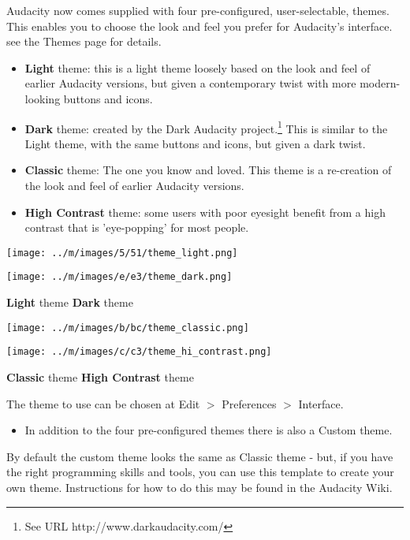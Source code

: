 \documentclass[twocolumn]{book}
\begin{document}
Audacity now comes supplied with four pre-configured, user-selectable, themes.  This enables you to choose the look and feel you prefer for Audacity's interface. see the Themes page for details.
\begin{itemize}
\item \textbf{Light} theme: this is a light theme loosely based on the look and feel of earlier Audacity versions, but given a contemporary twist with more modern-looking buttons and icons. 
\item \textbf{Dark} theme: created by the Dark Audacity project.\footnote{See URL http://www.darkaudacity.com/} This is similar to the Light theme, with the same buttons and icons, but given a dark twist.
\item \textbf{Classic} theme: The one you know and loved. This theme is a re-creation of the look and feel of earlier Audacity versions. 
\item \textbf{High Contrast} theme: some users with poor eyesight benefit from a high contrast that is 'eye-popping' for most people.
\end{itemize}



\* \* \* \* \par\texttt{[image: ../m/images/5/51/theme\_light.png]}\par
\* \* \* \* \par\texttt{[image: ../m/images/e/e3/theme\_dark.png]}\par
\* \* \* \* 
\textbf{Light} theme
\* \* \* \* 
\textbf{Dark} theme


\* \* \* \* \par\texttt{[image: ../m/images/b/bc/theme\_classic.png]}\par
\* \* \* \* \par\texttt{[image: ../m/images/c/c3/theme\_hi\_contrast.png]}\par
\* \* \* \* 
\textbf{Classic} theme
\* \* \* \* 
\textbf{High Contrast} theme



The theme to use can be chosen at Edit \mbox{$>$} Preferences \mbox{$>$} Interface.  
\begin{itemize}
\item  In addition to the four pre-configured themes there is also a Custom theme.  
\end{itemize}
 By default the custom theme looks the same as Classic theme - but, if you have the right programming skills and tools, you can use this template to create your own theme.  Instructions for how to do this may be found in the Audacity Wiki.
\end{document}

